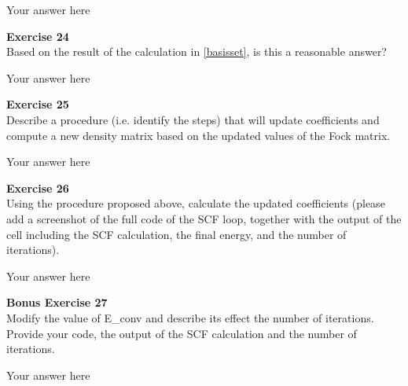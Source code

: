 \documentclass{article}
\begin{document}
Your answer here

\begin{mdframed}
\textbf{Exercise 24}\\
Based on the result of the calculation in \ref{basisset}, is this a reasonable answer?
\end{mdframed}

Your answer here

\begin{mdframed}
\textbf{Exercise 25}\\
Describe a procedure (i.e. identify the steps) that will update coefficients and compute a new density matrix based on the updated values of the Fock matrix.
\end{mdframed}

Your answer here

\begin{mdframed}
\textbf{Exercise 26}\\
Using the procedure proposed above, calculate the updated coefficients (please add a screenshot of the full code of the SCF loop, together with the output of the cell including the SCF calculation, the final energy, and the number of iterations).
\end{mdframed}

Your answer here

\begin{mdframed}
\textbf{Bonus Exercise 27}\\
Modify the value of E\_conv and describe its effect the number of iterations. Provide your code, the output of the SCF calculation and the number of iterations.
\end{mdframed}

Your answer here
\end{document}
